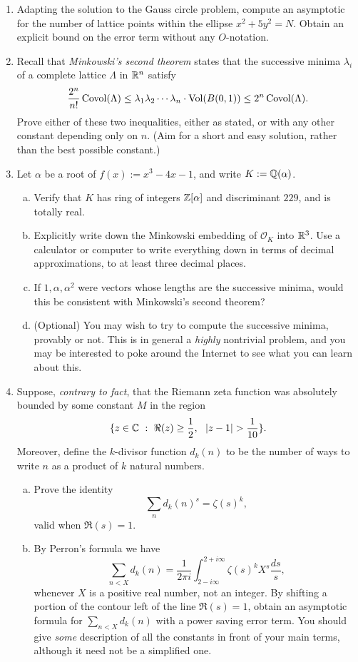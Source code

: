 \documentclass[12pt]{article}
\begin{document}
\begin{enumerate}[(1)]
\item
Adapting the solution to the Gauss circle problem, compute an asymptotic for the number of lattice points within the ellipse $x^2 + 5y^2 = N$. 
Obtain an explicit bound on the error term without any $O$-notation. 

\item
Recall that {\itshape Minkowski's second theorem} states that the successive minima $\lambda_i$ of a complete lattice $\Lambda$ in $\mathbb{R}^n$ satisfy
\[
\frac{2^n}{n!} \operatorname{Covol}(\Lambda) \leq \lambda_1 \lambda_2 \cdots \lambda_n \cdot \operatorname{Vol}(B(0, 1)) \leq 2^n \operatorname{Covol}(\Lambda).
\]
Prove either of these two inequalities, either as stated, or with any other constant depending only on $n$. 
(Aim for a short and easy solution, rather than the best possible constant.)

\item Let $\alpha$ be a root of $f(x) := x^3 - 4x - 1$, and write $K := \mathbb{Q}(\alpha)$.
\begin{enumerate}[(a)]
\item Verify that $K$ has ring of integers $\mathbb{Z}[\alpha]$ and discriminant $229$, and is totally real. 
\item Explicitly write down the Minkowski embedding of $\mathcal{O}_K$ into $\mathbb{R}^3$. Use a calculator or computer to write
everything down in terms of decimal approximations, to at least three decimal places.
\item If $1, \alpha, \alpha^2$ were vectors whose lengths are the successive minima, would this be consistent with Minkowski's
second theorem? 
\item (Optional) You may wish to try to compute the successive minima, provably or not. This is in general a {\itshape highly} nontrivial 
problem, and you may be interested to poke around the Internet to see what you can learn about this.
\end{enumerate}
\item Suppose, {\itshape contrary to fact}, that the Riemann zeta function was absolutely bounded by some constant $M$ in the region
\[
\{ z \in \mathbb{C} \ : \ \Re(z) \geq \frac{1}{2}, \ \ |z - 1| > \frac{1}{10} \}.
\]
Moreover, define the $k$-divisor function $d_k(n)$ to be the number of ways to write $n$ as a product of $k$ natural numbers.

\begin{enumerate}[(a)]
\item 
Prove the identity
\[
\sum_n d_k(n)^s = \zeta(s)^k,
\]
valid when $\Re(s) = 1$.
\item
By Perron's formula we have
\[
\sum_{n < X} d_k(n) = \frac{1}{2 \pi i} \int_{2 - i \infty}^{2 + i \infty} \zeta(s)^k X^s \frac{ds}{s},
\]
whenever $X$ is a positive real number, not an integer. By shifting a portion of the contour left of the line $\Re(s) = 1$,
obtain an asymptotic formula for $\sum_{n < X} d_k(n)$ with a power saving error term. You should give {\itshape some} description
of all the constants in front of your main terms, although it need not be a simplified one. 


\end{enumerate}
\end{enumerate}
\end{document}

